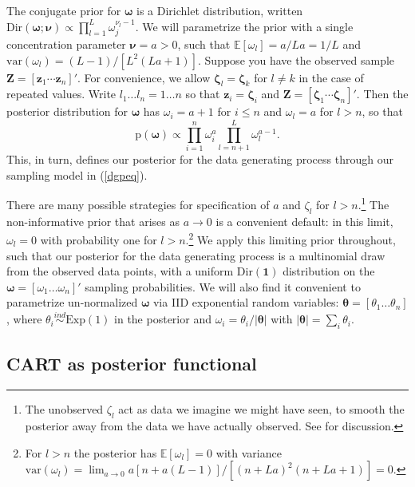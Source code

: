 \documentclass{article}
\begin{document}
The conjugate prior for $\boldsymbol{\omega}$ is a Dirichlet
distribution, written
$\mathrm{Dir}(\boldsymbol{\omega}; \boldsymbol{\nu}) \propto \prod_{l=1}^L\omega_j^{\nu_l-1}$.
We will parametrize the prior with a single concentration parameter
$\boldsymbol{\nu} = a >0$, such that $\mathbb{E}[\omega_l] = a/La = 1/L$
and $\mathrm{var}(\omega_l) = (L-1)/[L^2(La+1)]$. Suppose you have the
observed sample $\mathbf{Z} = [\mathbf{z}_1 \cdots \mathbf{z}_n]'$. For
convenience, we allow $\boldsymbol{\zeta}_l=\boldsymbol{\zeta}_k$ for
$l \neq k$ in the case of repeated values. Write
$l_1 \dots l_n = 1 \dots n$ so that
$\mathbf{z}_i = \boldsymbol{\zeta}_i$ and
$\mathbf{Z} = [\boldsymbol{\zeta}_1 \cdots \boldsymbol{\zeta}_n]'$. Then
the posterior distribution for $\boldsymbol{\omega}$ has
$\omega_i = a+1$ for $i\leq n$ and $\omega_l = a$ for $l>n$, so that
\begin{equation}\label{omegapost}
\mathrm{p}(\boldsymbol{\omega}) \propto \prod_{i=1}^n \omega_i^{a} \prod_{l=n+1}^L \omega_l^{a-1}.
\end{equation}
This, in turn, defines our posterior for the data generating process
through our sampling model in (\ref{dgpeq}).

There are many possible strategies for specification of $a$ and
$\zeta_l$ for $l>n$.\footnote{The unobserved $\zeta_l$ act as data we imagine we
might have seen, to smooth the posterior away from the data we have
actually observed. See \citet{poirier_bayesian_2011} for discussion.} The non-informative prior
that arises as $a\rightarrow 0$ is a convenient default: in this limit, $\omega_l = 0$ with probability one for
$l>n$.\footnote{For $l>n$ the posterior has
$\mathbb{E}[\omega_l]=0$ with variance
$\mathrm{var}(\omega_l) = \lim_{a \to 0} a[n+a(L-1)]/[(n+La)^2(n+La+1)] = 0$.}
We apply this limiting prior throughout, such that our posterior for the
data generating process is a multinomial draw from the observed
data points, with a uniform $\mathrm{Dir}(\boldsymbol{1})$ distribution
on the $\boldsymbol{\omega} = [\omega_1 \dots \omega_n]'$ sampling
probabilities.  We will also find it convenient to parametrize un-normalized $\boldsymbol{\omega}$ via
IID exponential random variables: $\boldsymbol{\theta} = [\theta_1 \dots \theta_n]$, where $\theta_i \stackrel{ind}{\sim} \mathrm{Exp}(1)$ in the posterior and $\omega_i = \theta_i/|\boldsymbol{\theta}|$ with $|\boldsymbol{\theta}| = \sum_i \theta_i$.

\subsection{CART as posterior functional}
\end{document}
